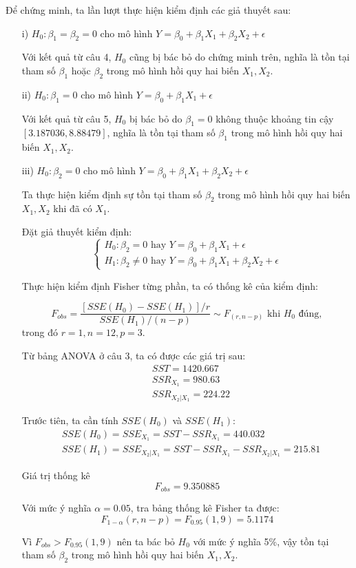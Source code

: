 \documentclass[a4paper]{article}
\theoremstyle{nonumberplain}
\begin{document}
Để chứng minh, ta lần lượt thực hiện kiểm định các giả thuyết sau:
\begin{enumerate}
	\item[i)] $H_0 : \beta_1 = \beta_2 = 0$ cho mô hình $Y = \beta_0 + \beta_1 X_1 + \beta_2 X_2 + \epsilon $
	
	Với kết quả từ câu 4, $H_0$ cũng bị bác bỏ do chứng minh trên, nghĩa là tồn tại tham số $\beta_1$ hoặc $\beta_2$ trong mô hình hồi quy hai biến $X_1, X_2$.
	
	\item[ii)] $H_0 : \beta_1 = 0$ cho mô hình $Y = \beta_0 + \beta_1 X_1 + \epsilon $
	
	Với kết quả từ câu 5, $H_0$ bị bác bỏ do $\beta_1 = 0$ không thuộc khoảng tin cậy $[3.187036,8.88479]$, nghĩa là tồn tại tham số $\beta_1$ trong mô hình hồi quy hai biến $X_1, X_2$.
	
	\item[iii)] $H_0 : \beta_2 = 0$ cho mô hình $Y = \beta_0 + \beta_1 X_1 + \beta_2 X_2 + \epsilon $
	
	Ta thực hiện kiểm định sự tồn tại tham số $\beta_2$ trong mô hình hồi quy hai biến $X_1, X_2$ khi đã có $X_1$.
	
	Đặt giả thuyết kiểm định:
	\[\begin{cases}
		H_0 : \beta_2 = 0 \text{ hay } Y = \beta_0 + \beta_1 X_1 + \epsilon \\
		H_1 : \beta_2 \ne 0 \text{ hay } Y = \beta_0 + \beta_1 X_1 + \beta_2 X_2 + \epsilon 
	\end{cases}\]
	
	Thực hiện kiểm định Fisher từng phần, ta có thống kê của kiểm định: 
	
	$$F_{obs} = \displaystyle \frac{\left [ SSE (H_0) - SSE(H_1) \right ] / r}{SSE(H_1)/(n-p)}  \sim F_{(r,n-p)} \text{ khi } H_0 \text{ đúng},$$
	trong đó $r = 1, n = 12, p = 3$.
	
	Từ bảng ANOVA ở câu 3, ta có được các giá trị sau:
	\begin{align*}
		&SST = 1420.667\\
		&SSR_{X_1} = 980.63\\
		&SSR_{X_2|X_1} = 224.22
	\end{align*}
	
	Trước tiên, ta cần tính $SSE (H_0)$ và $SSE(H_1)$:
	\begin{align*}
		&SSE(H_0) = SSE_{X_1} = SST - SSR_{X_1} = 440.032\\
		&SSE(H_1) = SSE_{X_2|X_1} = SST - SSR_{X_1} - SSR_{X_2|X_1} = 215.81
	\end{align*}
	
	Giá trị thống kê $$F_{obs} = 9.350885$$
	
	Với mức ý nghĩa $\alpha = 0.05$, tra bảng thống kê Fisher ta được:
	$$F_{1-\alpha}(r,n-p) = F_{0.95}(1,9) = 5.1174$$
	
	Vì $F_{obs} > F_{0.95}(1,9)$ nên ta bác bỏ $H_0$ với mức ý nghĩa 5\%, vậy tồn tại tham số $\beta_2$ trong mô hình hồi quy hai biến $X_1, X_2$.
\end{enumerate}
\end{document}
